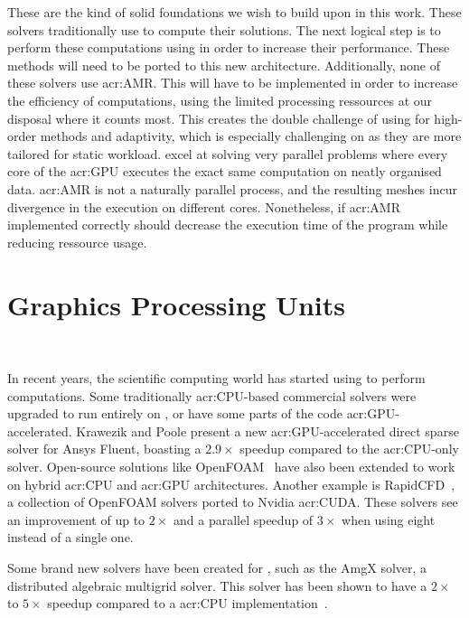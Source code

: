 These are the kind of solid foundations we wish to build upon in this work. These solvers
traditionally use  to compute their solutions. The next logical step is to
perform these computations using  in order to increase their performance. These
methods will need to be ported to this new architecture. Additionally, none of these solvers use
\acrfull{acr:AMR}. This will have to be implemented in order to increase the efficiency of
computations, using the limited processing ressources at our disposal where it counts most. This
creates the double challenge of using  for high-order methods and adaptivity,
which is especially challenging on  as they are more tailored for static
workload.  excel at solving very parallel problems where every core of the
\acrshort{acr:GPU} executes the exact same computation on neatly organised data. \Acrshort{acr:AMR}
is not a naturally parallel process, and the resulting meshes incur divergence in the execution on
different cores. Nonetheless, if \Acrshort{acr:AMR} implemented correctly should decrease the
execution time of the program while reducing ressource usage.

\section{Graphics Processing Units}\label{section:literature_review:gpu}

~\cite{Klockner2009}

In recent years, the scientific computing world has started using  to perform
computations. Some traditionally \acrshort{acr:CPU}-based commercial solvers were upgraded to run
entirely on , or have some parts of the code \acrshort{acr:GPU}-accelerated.
Krawezik and Poole present a new \acrshort{acr:GPU}-accelerated direct sparse solver for Ansys
Fluent, boasting a \(2.9 \times \) speedup compared to the \acrshort{acr:CPU}-only solver.
Open-source solutions like OpenFOAM~\cite{Alonazi2015} have also been extended to work on hybrid
\acrshort{acr:CPU} and \acrshort{acr:GPU} architectures. Another example is
RapidCFD~\cite{SimFlow2020}, a collection of OpenFOAM solvers ported to Nvidia \acrshort{acr:CUDA}.
These solvers see an improvement of up to \(2 \times \) and a parallel speedup of \(3 \times \)
when using eight  instead of a single one.

Some brand new solvers have been created for , such as the AmgX solver, a
distributed algebraic multigrid solver. This solver has been shown to have a \(2 \times \) to \(5
\times \) speedup compared to a \acrshort{acr:CPU} implementation~\cite{Naumov2015}.

